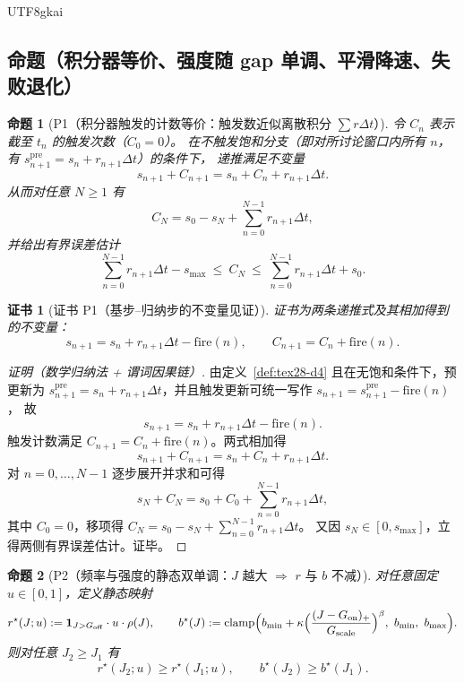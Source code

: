 \documentclass[12pt]{article}
\newtheorem{proposition}{命题}[section]
\newtheorem{Certificate}{证书}[section]
\newcommand{\indicator}[1]{\mathbf{1}_{#1}}
\newcommand{\clamp}{\operatorname{clamp}}
\begin{document}
\begin{CJK*}{UTF8}{gkai}
\subsection{命题（积分器等价、强度随 gap 单调、平滑降速、失败退化）}
\label{subsec:tex28-props}

\begin{proposition}[P1（积分器触发的计数等价：触发数近似离散积分 $\sum r\Delta t$）]
\label{prop:tex28-p1}
令 $C_n$ 表示截至 $t_n$ 的触发次数（$C_0=0$）。
在不触发饱和分支（即对所讨论窗口内所有 $n$，有 $s_{n+1}^{\mathrm{pre}}=s_n+r_{n+1}\Delta t$）的条件下，
递推满足不变量
\[
  s_{n+1}+C_{n+1}=s_n+C_n+r_{n+1}\Delta t.
\]
从而对任意 $N\ge 1$ 有
\[
  C_N = s_0 - s_N + \sum_{n=0}^{N-1} r_{n+1}\Delta t,
\]
并给出有界误差估计
\[
  \sum_{n=0}^{N-1} r_{n+1}\Delta t - s_{\max}
  \ \le\
  C_N
  \ \le\
  \sum_{n=0}^{N-1} r_{n+1}\Delta t + s_0.
\]
\end{proposition}

\begin{Certificate}[证书 P1（基步--归纳步的不变量见证）]
\label{cert:tex28-p1}
证书为两条递推式及其相加得到的不变量：
\[
  s_{n+1}=s_n+r_{n+1}\Delta t-\mathrm{fire}(n),\qquad
  C_{n+1}=C_n+\mathrm{fire}(n).
\]
\end{Certificate}

\begin{proof}[证明（数学归纳法 + 谓词因果链）]
由定义~\ref{def:tex28-d4} 且在无饱和条件下，预更新为 $s_{n+1}^{\mathrm{pre}}=s_n+r_{n+1}\Delta t$，并且触发更新可统一写作
$s_{n+1}=s_{n+1}^{\mathrm{pre}}-\mathrm{fire}(n)$，
故
\[
  s_{n+1}=s_n+r_{n+1}\Delta t-\mathrm{fire}(n).
\]
触发计数满足 $C_{n+1}=C_n+\mathrm{fire}(n)$。两式相加得
\[
  s_{n+1}+C_{n+1}=s_n+C_n+r_{n+1}\Delta t.
\]
对 $n=0,\dots,N-1$ 逐步展开并求和可得
\[
  s_N+C_N = s_0+C_0+\sum_{n=0}^{N-1}r_{n+1}\Delta t,
\]
其中 $C_0=0$，移项得 $C_N=s_0-s_N+\sum_{n=0}^{N-1}r_{n+1}\Delta t$。
又因 $s_N\in[0,s_{\max}]$，立得两侧有界误差估计。证毕。
\end{proof}

\begin{proposition}[P2（频率与强度的静态双单调：$J$ 越大 $\Rightarrow$ $r$ 与 $b$ 不减）]
\label{prop:tex28-p2}
对任意固定 $u\in[0,1]$，定义静态映射
\[
  r^\star(J;u):=\indicator{J>G_{\mathrm{off}}}\cdot u\cdot \rho(J),
  \qquad
  b^\star(J):=\clamp\Bigl(b_{\min}+\kappa\Bigl(\frac{(J-G_{\mathrm{on}})_{+}}{G_{\mathrm{scale}}}\Bigr)^{\beta},\
    b_{\min},\ b_{\max}\Bigr).
\]
则对任意 $J_2\ge J_1$ 有
\[
  r^\star(J_2;u)\ge r^\star(J_1;u),
  \qquad
  b^\star(J_2)\ge b^\star(J_1).
\]
\end{proposition}


\end{CJK*}
\end{document}
